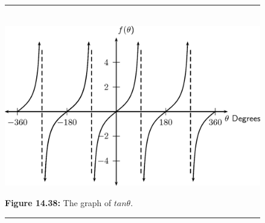 	\begin{figure}[H] %
    \begin{center}
    \rule[.1in]{\figurerulewidth}{.005in} \\
        \label{m39414*uid71!!!underscore!!!media}\label{m39414*uid71!!!underscore!!!printimage}\includegraphics{col11306.imgs/m39414_MG10C15_044.png} %
      \vspace{2pt}
    \vspace{\rubberspace}\par \begin{cnxcaption}
	  \small \textbf{Figure 14.38: }The graph of $tan\theta $.
	\end{cnxcaption}
    \vspace{.1in}
    \rule[.1in]{\figurerulewidth}{.005in} \\
    \end{center}
 \end{figure}       
      \label{m39414*uid72}
